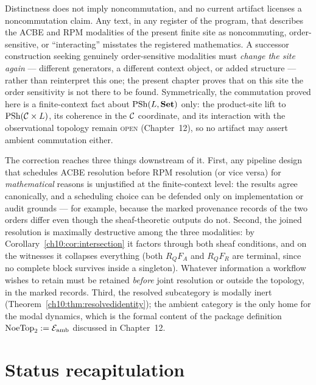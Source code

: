 \begin{boundary}
\label{ch10:bnd:noncommutation}
Distinctness does not imply noncommutation, and no current artifact licenses
a noncommutation claim. Any text, in any register of the program, that
describes the ACBE and RPM modalities of the present finite site as
noncommuting, order-sensitive, or ``interacting'' misstates the registered
mathematics. A successor construction seeking genuinely order-sensitive
modalities must \emph{change the site again} --- different generators, a
different context object, or added structure --- rather than reinterpret this
one; the present chapter proves that on this site the order sensitivity is
not there to be found. Symmetrically, the commutation proved here is a
finite-context fact about $\mathrm{PSh}(L, \mathbf{Set})$ only: the product-site lift to
$\mathrm{PSh}(\mathcal{C} \times L)$, its coherence in the $\mathcal{C}$ coordinate, and its
interaction with the observational topology remain \textsc{open}
(Chapter~12), so no artifact may assert ambient commutation either.
\end{boundary}

\begin{remark}
\label{ch10:rem:downstream}
The correction reaches three things downstream of it. First, any
pipeline design that schedules ACBE resolution before RPM resolution (or vice
versa) for \emph{mathematical} reasons is unjustified at the finite-context
level: the results agree canonically, and a scheduling choice can be defended
only on implementation or audit grounds --- for example, because the marked
provenance records of the two orders differ even though the sheaf-theoretic
outputs do not. Second, the joined resolution is maximally destructive among
the three modalities: by Corollary~\ref{ch10:cor:intersection} it factors
through both sheaf conditions, and on the witnesses it collapses everything
(both $R_Q F_A$ and $R_Q F_R$ are terminal, since no complete block survives
inside a singleton). Whatever information a workflow wishes to retain must be
retained \emph{before} joint resolution or outside the topology, in the
marked records. Third, the resolved subcategory is modally inert
(Theorem~\ref{ch10:thm:resolvedidentity}); the ambient category is the only
home for the modal dynamics, which is the formal content of the package
definition $\mathrm{NoeTop}_2 := \mathcal{E}_{\mathrm{amb}}$ discussed in Chapter~12.
\end{remark}

\section{Status recapitulation}
\label{ch10:sec:status}


